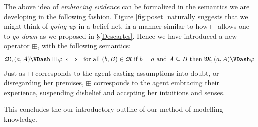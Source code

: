 \documentclass[11pt,titlepage]{report}
\numberwithin{equation}{subsection}
\renewcommand{\Omega}{\mathfrak{M}}
\newcommand{\BM}{\boxminus}
\newcommand{\BP}{\boxplus}
\renewcommand{\phi}{\varphi}
\begin{document}
The above idea of \emph{embracing evidence} can be formalized in the
semantics we are developing in the following fashion.  
Figure \ref{fig:poset}
naturally suggests that we might think of \emph{going up} in a belief
net, in a manner similar to how $\BM$ allows one to \emph{go down} as
 we proposed in \S\ref{Descartes}. Hence we have introduced a new
 operator $\BP$, with the following semantics:
\[ \Omega,(a,A) \VDash \BP \phi \iff \textup{ for all }
(b,B)\in\Omega\textup{ if } b = a \textup{ and } A\subseteq B \textup{
  then } \Omega,(a,A) \VDash \phi \]
Just as $\BM$ corresponds to the agent casting assumptions into doubt,
or disregarding her premises, $\BP$ corresponds to the agent
embracing their experience, suspending disbelief and accepting her
intuitions and senses.

This concludes the our introductory outline of our method of
modelling knowledge.
\end{document}
